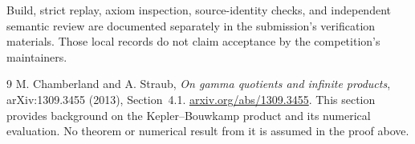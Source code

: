 \documentclass[10pt,letterpaper]{article}
\begin{document}
Build, strict replay, axiom inspection, source-identity checks, and independent semantic review are documented separately in the submission's verification materials. Those local records do not claim acceptance by the competition's maintainers.

\begin{thebibliography}{9}
M. Chamberland and A. Straub,
\emph{On gamma quotients and infinite products},
arXiv:1309.3455 (2013), Section~4.1.
\href{https://arxiv.org/abs/1309.3455}{arxiv.org/abs/1309.3455}.
This section provides background on the Kepler--Bouwkamp product and its numerical evaluation. No theorem or numerical result from it is assumed in the proof above.
\end{thebibliography}
\end{document}
